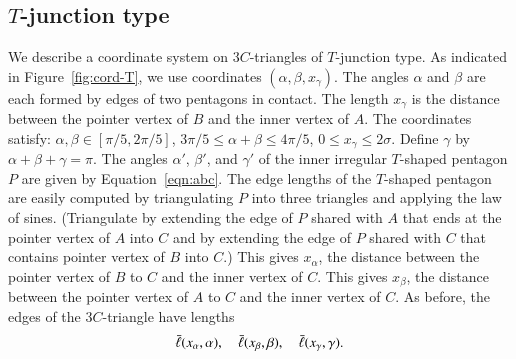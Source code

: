 

\subsection{$T$-junction type}

We describe a coordinate system on $3C$-triangles of $T$-junction
type.  As indicated in Figure~\ref{fig:cord-T}, we use coordinates
$(\alpha,\beta,x_\gamma)$.  The angles $\alpha$ and $\beta$ are each
formed by edges of two pentagons in contact.  The length $x_\gamma$ is
the distance between the pointer vertex of $B$ and the inner vertex of
$A$.  The coordinates satisfy: $\alpha,\beta\in[\pi/5,2\pi/5]$,
$3\pi/5\le \alpha+\beta\le 4\pi/5$, $0\le x_\gamma\le 2\sigma$.
Define $\gamma$ by $\alpha+\beta+\gamma=\pi$.  The angles $\alpha'$,
$\beta'$, and $\gamma'$ of the inner irregular $T$-shaped pentagon $P$
are given by Equation~\ref{eqn:abc}.  The edge lengths of the
$T$-shaped pentagon are easily computed by triangulating $P$ into
three triangles and applying the law of sines.  (Triangulate by
extending the edge of $P$ shared with $A$ that ends at the pointer
vertex of $A$ into $C$ and by extending the edge of $P$ shared with
$C$ that contains pointer vertex of $B$ into $C$.)  This gives
$x_\alpha$, the distance between the pointer vertex of $B$ to $C$ and
the inner vertex of $C$.  This gives $x_\beta$, the distance between
the pointer vertex of $A$ to $C$ and the inner vertex of $C$.  As
before, the edges of the $3C$-triangle have lengths
\[
\bar\ell(x_\alpha,\alpha),\quad \bar\ell(x_\beta,\beta),\quad \bar\ell(x_\gamma,\gamma).
\]




